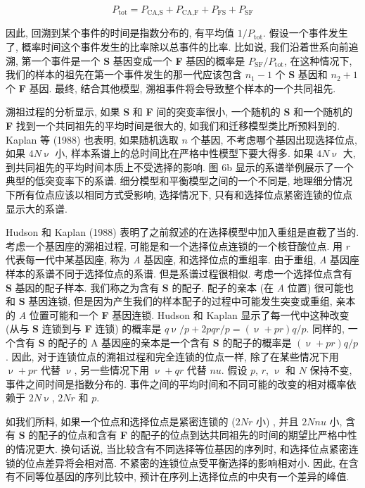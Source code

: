 \documentclass[
    12pt,%
    ]{article}
\begin{document}
\begin{equation*}
    P_{\text{tot}} = P_{\text{CA},\text{S}} + P_{\text{CA},\text{F}} + P_{\text{FS}} + P_{\text{SF}}
\end{equation*}

因此, 回溯到某个事件的时间是指数分布的, 有平均值 $1/P_{\text{tot}}$. 假设一个事件发生了,
概率时间这个事件发生的比率除以总事件的比率. 比如说, 我们沿着世系向前追溯,
第一个事件是一个 \textbf{S} 基因变成一个 \textbf{F} 基因的概率是 $P_{\text{SF}}/P_{\text{tot}}$,
在这种情况下, 我们的样本的祖先在第一个事件发生的那一代应该包含 $n_{1}-1$ 个 \textbf{S} 基因和 $n_{2}+1$
个 \textbf{F} 基因. 最终, 结合其他模型, 溯祖事件将会导致整个样本的一个共同祖先.

溯祖过程的分析显示, 如果 \textbf{S} 和 \textbf{F} 间的突变率很小,
一个随机的 \textbf{S} 和一个随机的 \textbf{F} 找到一个共同祖先的平均时间是很大的, 如我们和迁移模型类比所预料到的. Kaplan
等 (1988) 也表明, 如果随机选取 $n$ 个基因, 不考虑哪个基因出现选择位点, 如果 $4N\upnu$ 小,
样本系谱上的总时间比在严格中性模型下要大得多. 如果 $4N\upnu$ 大, 到共同祖先的平均时间本质上不受选择的影响. 图 6b
显示的系谱举例展示了一个典型的低突变率下的系谱. 细分模型和平衡模型之间的一个不同是,
地理细分情况下所有位点应该以相同方式受影响, 选择情况下, 只有和选择位点紧密连锁的位点显示大的系谱.

Hudson 和 Kaplan (1988) 表明了之前叙述的在选择模型中加入重组是直截了当的. 考虑一个基因座的溯祖过程,
可能是和一个选择位点连锁的一个核苷酸位点. 用 $r$ 代表每一代中某基因座, 称为 \textit{A} 基因座, 和选择位点的重组率.
由于重组, \textit{A} 基因座样本的系谱不同于选择位点的系谱. 但是系谱过程很相似.
考虑一个选择位点含有 \textbf{S} 基因的配子样本. 我们称之为含有 \textbf{S} 的配子. 配子的亲本 (在 \textit{A} 位置)
很可能也和 \textbf{S} 基因连锁, 但是因为产生我们的样本配子的过程中可能发生突变或重组,
亲本的 \textit{A} 位置可能和一个 \textbf{F} 基因连锁. Hudson 和 Kaplan 显示了每一代中这种改变
(从与 \textbf{S} 连锁到与 \textbf{F} 连锁) 的概率是 $q\upnu/p+2pqr/p=(\upnu+pr)q/p$. 同样的,
一个含有 \textbf{S} 的配子的 A 基因座的亲本是一个含有 \textbf{S} 的配子的概率是 $(\upnu+pr)q/p$. 因此,
对于连锁位点的溯祖过程和完全连锁的位点一样, 除了在某些情况下用 $\upnu+pr$ 代替 $\upnu$, 另一些情况下用 $\upnu+qr$ 代替 $nu
$. 假设 $p$, $r$, $\upnu$ 和 $N$ 保持不变, 事件之间时间是指数分布的. 事件之间的平均时间和不同可能的改变的相对概率依赖于
$2N\upnu$, $2Nr$ 和 $p$.

如我们所料, 如果一个位点和选择位点是紧密连锁的 ($2Nr$ 小) , 并且 $2Nnu$ 小,
含有 \textbf{S} 的配子的位点和含有 \textbf{F} 的配子的位点到达共同祖先的时间的期望比严格中性的情况更大. 换句话说,
当比较含有不同选择等位基因的序列时, 和选择位点紧密连锁的位点差异将会相对高. 不紧密的连锁位点受平衡选择的影响相对小. 因此,
在含有不同等位基因的序列比较中, 预计在序列上选择位点的中央有一个差异的峰值.
\end{document}

